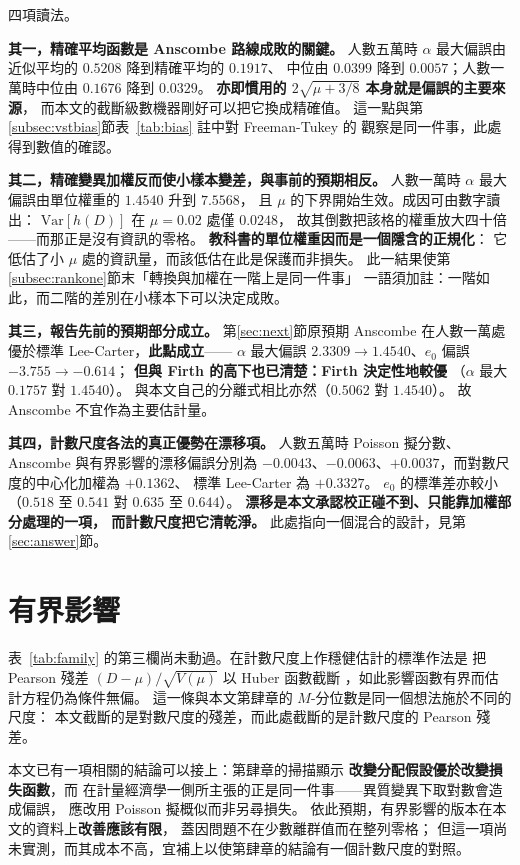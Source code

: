 \documentclass[UTF8, fontset=macnew, a4paper, 12pt]{ctexart}
\begin{document}
四項讀法。

\textbf{其一，精確平均函數是 Anscombe 路線成敗的關鍵。}
人數五萬時 $\alpha$ 最大偏誤由近似平均的 $0.5208$ 降到精確平均的 $0.1917$、
中位由 $0.0399$ 降到 $0.0057$；人數一萬時中位由 $0.1676$ 降到 $0.0329$。
\textbf{亦即慣用的 $2\sqrt{\mu+3/8}$ 本身就是偏誤的主要來源}，
而本文的截斷級數機器剛好可以把它換成精確值。
這一點與第\ref{subsec:vstbias}節表~\ref{tab:bias} 註中對 Freeman-Tukey 的
觀察是同一件事，此處得到數值的確認。

\textbf{其二，精確變異加權反而使小樣本變差，與事前的預期相反。}
人數一萬時 $\alpha$ 最大偏誤由單位權重的 $1.4540$ 升到 $7.5568$，
且 $\mu$ 的下界開始生效。成因可由數字讀出：
$\mathrm{Var}[h(D)]$ 在 $\mu=0.02$ 處僅 $0.0248$，
故其倒數把該格的權重放大四十倍——而那正是沒有資訊的零格。
\textbf{教科書的單位權重因而是一個隱含的正規化}：
它低估了小 $\mu$ 處的資訊量，而該低估在此是保護而非損失。
此一結果使第\ref{subsec:rankone}節末「轉換與加權在一階上是同一件事」
一語須加註：一階如此，而二階的差別在小樣本下可以決定成敗。

\textbf{其三，報告先前的預期部分成立。} 第\ref{sec:next}節原預期
Anscombe 在人數一萬處優於標準 Lee-Carter，\textbf{此點成立}——
$\alpha$ 最大偏誤 $2.3309\to1.4540$、$e_0$ 偏誤 $-3.755\to-0.614$；
\textbf{但與 Firth 的高下也已清楚：Firth 決定性地較優}
（$\alpha$ 最大 $0.1757$ 對 $1.4540$）。
與本文自己的分離式相比亦然（$0.5062$ 對 $1.4540$）。
故 Anscombe 不宜作為主要估計量。

\textbf{其四，計數尺度各法的真正優勢在漂移項。}
人數五萬時 Poisson 擬分數、Anscombe 與有界影響的漂移偏誤分別為
$-0.0043$、$-0.0063$、$+0.0037$，而對數尺度的中心化加權為 $+0.1362$、
標準 Lee-Carter 為 $+0.3327$。
$e_0$ 的標準差亦較小（$0.518$ 至 $0.541$ 對 $0.635$ 至 $0.644$）。
\textbf{漂移是本文承認校正碰不到、只能靠加權部分處理的一項，
而計數尺度把它清乾淨。} 此處指向一個混合的設計，見第\ref{sec:answer}節。

\section{有界影響}\label{sec:bounded}

表~\ref{tab:family} 的第三欄尚未動過。在計數尺度上作穩健估計的標準作法是
把 Pearson 殘差 $(D-\mu)/\sqrt{V(\mu)}$ 以 Huber 函數截斷
\citep{cantoni2001,kunsch1989}，如此影響函數有界而估計方程仍為條件無偏。
這一條與本文第肆章的 $M$-分位數是同一個想法施於不同的尺度：
本文截斷的是對數尺度的殘差，而此處截斷的是計數尺度的 Pearson 殘差。

本文已有一項相關的結論可以接上：第肆章的掃描顯示
\textbf{改變分配假設優於改變損失函數}，而 \citet{santossilva2006}
在計量經濟學一側所主張的正是同一件事——異質變異下取對數會造成偏誤，
應改用 Poisson 擬概似而非另尋損失。
依此預期，有界影響的版本在本文的資料上\textbf{改善應該有限}，
蓋因問題不在少數離群值而在整列零格；
但這一項尚未實測，而其成本不高，宜補上以使第肆章的結論有一個計數尺度的對照。
\end{document}
